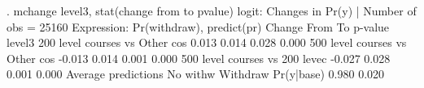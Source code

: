. mchange level3, stat(change from to pvalue)
{\smallskip}
logit: Changes in Pr(y) | Number of obs = 25160
{\smallskip}
Expression: Pr(withdraw), predict(pr)
{\smallskip}
                                 {\VBAR}    Change       From         To    p-value 
level3                           {\VBAR}                                            
 200 level courses vs Other co{\tytilde}s {\VBAR}     0.013      0.014      0.028      0.000 
 500 level courses vs Other co{\tytilde}s {\VBAR}    -0.013      0.014      0.001      0.000 
 500 level courses vs 200 leve{\tytilde}c {\VBAR}    -0.027      0.028      0.001      0.000 
{\smallskip}
Average predictions
{\smallskip}
             {\VBAR} No with{\tytilde}w   Withdraw 
  Pr(y|base) {\VBAR}     0.980      0.020 
{\smallskip}
{\smallskip}
